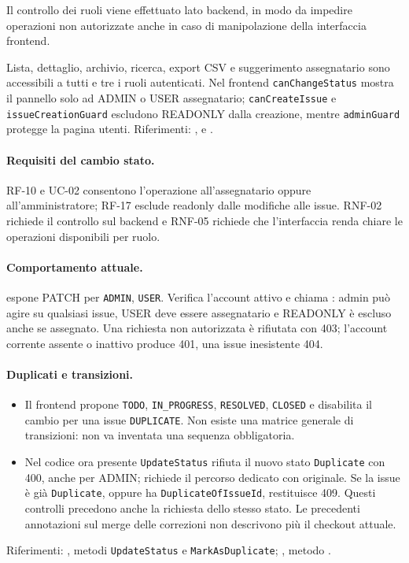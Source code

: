 \documentclass[12pt,a4paper]{article}
\begin{document}
Il controllo dei ruoli viene effettuato lato backend, in modo da impedire operazioni non autorizzate anche in caso di manipolazione della interfaccia frontend.

Lista, dettaglio, archivio, ricerca, export CSV e suggerimento assegnatario sono accessibili a tutti e tre i ruoli autenticati. Nel frontend \texttt{canChangeStatus} mostra il pannello solo ad ADMIN o USER assegnatario; \texttt{canCreateIssue} e \texttt{issueCreationGuard} escludono READONLY dalla creazione, mentre \texttt{adminGuard} protegge la pagina utenti. Riferimenti: ,  e .

\paragraph{Requisiti del cambio stato.}
RF-10 e UC-02 consentono l'operazione all'assegnatario oppure all'amministratore; RF-17 esclude readonly dalle modifiche alle issue. RNF-02 richiede il controllo sul backend e RNF-05 richiede che l'interfaccia renda chiare le operazioni disponibili per ruolo.

\paragraph{Comportamento attuale.}
 espone PATCH  per \texttt{ADMIN}, \texttt{USER}. Verifica l'account attivo e chiama : admin può agire su qualsiasi issue, USER deve essere assegnatario e READONLY è escluso anche se assegnato. Una richiesta non autorizzata è rifiutata con 403; l'account corrente assente o inattivo produce 401, una issue inesistente 404.

\paragraph{Duplicati e transizioni.}
\begin{itemize}
    \item Il frontend propone \texttt{TODO}, \texttt{IN\_PROGRESS}, \texttt{RESOLVED}, \texttt{CLOSED} e disabilita il cambio per una issue \texttt{DUPLICATE}. Non esiste una matrice generale di transizioni: non va inventata una sequenza obbligatoria.
    \item Nel codice ora presente \texttt{UpdateStatus} rifiuta il nuovo stato \texttt{Duplicate} con 400, anche per ADMIN; richiede il percorso dedicato con originale. Se la issue è già \texttt{Duplicate}, oppure ha \texttt{DuplicateOfIssueId}, restituisce 409. Questi controlli precedono anche la richiesta dello stesso stato. Le precedenti annotazioni sul merge delle correzioni non descrivono più il checkout attuale.
\end{itemize}
Riferimenti: , metodi \texttt{UpdateStatus} e \texttt{MarkAsDuplicate}; , metodo .
\end{document}
